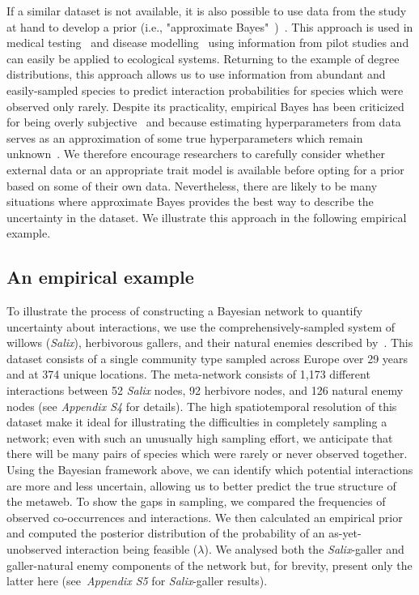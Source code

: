 \documentclass[12pt]{article}
\begin{document}
\begin{spacing}{2.0}
        If a similar dataset is not available, it is also possible to use data from the study at hand to develop a prior (i.e., "approximate Bayes"~\citet{Gelmanblog})~\citep{Casella1985,Spiegelhalter2000}. This approach is used in medical testing~\citep{Copas1972,Spiegelhalter2000} and disease modelling~\citep{Leyland2005,Brooks2015} using information from pilot studies and can easily be applied to ecological systems. Returning to the example of degree distributions, this approach allows us to use information from abundant and easily-sampled species to predict interaction probabilities for species which were observed only rarely. Despite its practicality, empirical Bayes has been criticized for being overly subjective~\citep{Berger2006} and because estimating hyperparameters from data serves as an approximation of some true hyperparameters which remain unknown~\citep{Gelmanblog}. We therefore encourage researchers to carefully consider whether external data or an appropriate trait model is available before opting for a prior based on some of their own data. Nevertheless, there are likely to be many situations where approximate Bayes provides the best way to describe the uncertainty in the dataset. We illustrate this approach in the following empirical example.


  \subsection*{An empirical example}

      To illustrate the process of constructing a Bayesian network to quantify uncertainty about interactions, we use the comprehensively-sampled system of willows (\emph{Salix}), herbivorous gallers, and their natural enemies described by~\citet{Kopelke2017}. This dataset consists of a single community type sampled across Europe over 29 years and at 374 unique locations. The meta-network consists of 1,173 different interactions between 52 \emph{Salix} nodes, 92 herbivore nodes, and 126 natural enemy nodes (see \emph{Appendix S4} for details). 
      The high spatiotemporal resolution of this dataset make it ideal for illustrating the difficulties in completely sampling a network; even with such an unusually high sampling effort, we anticipate that there will be many pairs of species which were rarely or never observed together. Using the Bayesian framework above, we can identify which potential interactions are more and less uncertain, allowing us to better predict the true structure of the metaweb. To show the gaps in sampling, we compared the frequencies of observed co-occurrences and interactions. We then calculated an empirical prior and computed the posterior distribution of the probability of an as-yet-unobserved interaction being feasible ($\lambda$).
      We analysed both the \emph{Salix}-galler and galler-natural enemy components of the network but, for brevity, present only the latter here (see~\emph{Appendix S5} for \emph{Salix}-galler results).



\end{spacing}
\end{document}
